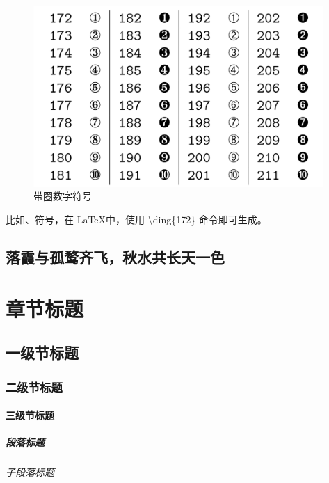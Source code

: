 \documentclass{QHUthesis}
\begin{document}
\begin{figure}[htbp]
	\centering
		\includegraphics[width=\textwidth]{带圈数字符号}
	\caption{带圈数字符号}
	\label{fig:2}
\end{figure}

比如、符号，在 \LaTeX 中，使用 \textbackslash ding\{172\}  命令即可生成。

\zhlipsum[1-3]
\section{落霞与孤鹜齐飞，秋水共长天一色}
\zhlipsum[1-5]

\chapter{章节标题}

\section{一级节标题}

\subsection{二级节标题}

\subsubsection{三级节标题}

\paragraph{段落标题}

\zhlipsum[1]

\subparagraph{子段落标题}
\zhlipsum[1]

\backmatter

 

\Thanks
\zhlipsum[1]
\Appendix
\zhlipsum[1]
\end{document}
